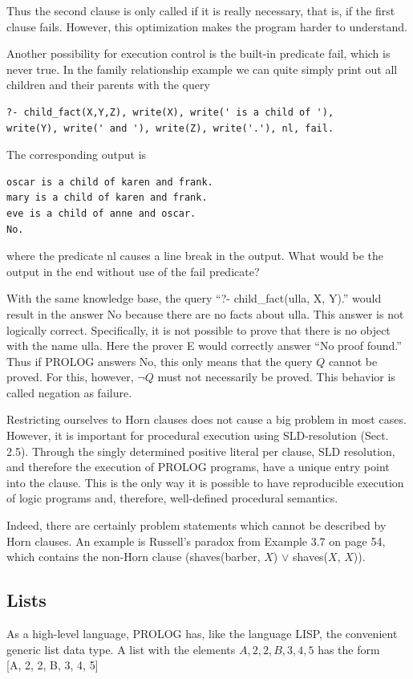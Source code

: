 \documentclass[10pt]{book}
\begin{document}
Thus the second clause is only called if it is really necessary, that is, if the first clause fails. However, this optimization makes the program harder to understand.

Another possibility for execution control is the built-in predicate fail, which is never true. In the family relationship example we can quite simply print out all children and their parents with the query

\begin{verbatim}
?- child_fact(X,Y,Z), write(X), write(' is a child of '),
write(Y), write(' and '), write(Z), write('.'), nl, fail.
\end{verbatim}

The corresponding output is

\begin{verbatim}
oscar is a child of karen and frank.
mary is a child of karen and frank.
eve is a child of anne and oscar.
No.
\end{verbatim}

where the predicate nl causes a line break in the output. What would be the output in the end without use of the fail predicate?

With the same knowledge base, the query ``?- child\_fact(ulla, X, Y).'' would result in the answer No because there are no facts about ulla. This answer is not logically correct. Specifically, it is not possible to prove that there is no object with the name ulla. Here the prover E would correctly answer ``No proof found.'' Thus if PROLOG answers No, this only means that the query $Q$ cannot be proved. For this, however, $\neg Q$ must not necessarily be proved. This behavior is called negation as failure.

Restricting ourselves to Horn clauses does not cause a big problem in most cases. However, it is important for procedural execution using SLD-resolution (Sect. 2.5). Through the singly determined positive literal per clause, SLD resolution, and therefore the execution of PROLOG programs, have a unique entry point into the clause. This is the only way it is possible to have reproducible execution of logic programs and, therefore, well-defined procedural semantics.

Indeed, there are certainly problem statements which cannot be described by Horn clauses. An example is Russell's paradox from Example 3.7 on page 54, which contains the non-Horn clause (shaves(barber, $X$) $\vee$ shaves($X$, $X$)).

\subsection{Lists}
As a high-level language, PROLOG has, like the language LISP, the convenient generic list data type. A list with the elements $A, 2,2, B, 3,4,5$ has the form\\
[A, 2, 2, B, 3, 4, 5]
\end{document}
